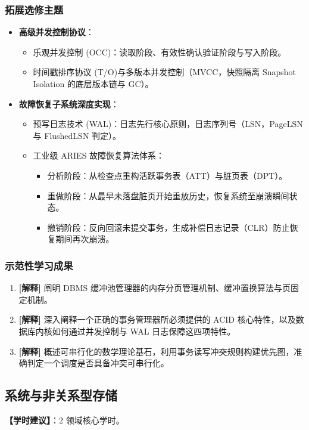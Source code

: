 \subsubsection{拓展选修主题}
\begin{itemize}
    \item \textbf{高级并发控制协议}：
    \begin{itemize}
        \item 乐观并发控制 (OCC)：读取阶段、有效性确认验证阶段与写入阶段。
        \item 时间戳排序协议 (T/O)与多版本并发控制（MVCC，快照隔离 Snapshot Isolation 的底层版本链与 GC）。
    \end{itemize}
    \item \textbf{故障恢复子系统深度实现}：
    \begin{itemize}
        \item 预写日志技术 (WAL)：日志先行核心原则，日志序列号（LSN，PageLSN 与 FlushedLSN 判定）。
        \item 工业级 ARIES 故障恢复算法体系：
        \begin{itemize}
            \item 分析阶段：从检查点重构活跃事务表（ATT）与脏页表（DPT）。
            \item 重做阶段：从最早未落盘脏页开始重放历史，恢复系统至崩溃瞬间状态。
            \item 撤销阶段：反向回滚未提交事务，生成补偿日志记录（CLR）防止恢复期间再次崩溃。
        \end{itemize}
    \end{itemize}
\end{itemize}

\subsubsection{示范性学习成果}
\begin{enumerate}
    \item \textbf{[解释]} 阐明 DBMS 缓冲池管理器的内存分页管理机制、缓冲置换算法与页固定机制。
    \item \textbf{[解释]} 深入阐释一个正确的事务管理器所必须提供的 ACID 核心特性，以及数据库内核如何通过并发控制与 WAL 日志保障这四项特性。
    \item \textbf{[解释]} 概述可串行化的数学理论基石，利用事务读写冲突规则构建优先图，准确判定一个调度是否具备冲突可串行化。
\end{enumerate}

\subsection{系统与非关系型存储}
\textbf{【学时建议】}：2 领域核心学时。

